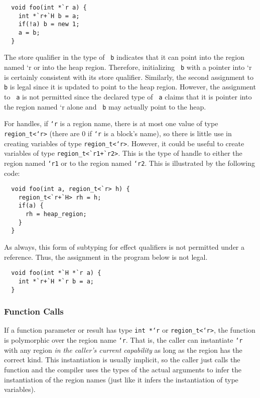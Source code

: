 \begin{verbatim}
  void foo(int *`r a) {
    int *`r+`H b = a;
    if(!a) b = new 1;
    a = b;
  }
\end{verbatim}

The store qualifier in the type of \texttt{ b} indicates that it can
point into the region named `r or into the heap region. Therefore,
initializing \texttt{ b} with a pointer into `r is certainly consistent
with its store qualifier. Similarly, the second assignment to \texttt{ b}
is legal since it is updated to point to the heap region. However, the
assignment to \texttt{ a} is not permitted since the declared type of \texttt{
  a} claims that it is pointer into the region named `r alone and \texttt{
  b} may actually point to the heap. 

For handles, if \texttt{`r} is a region name, there is at most one
value of type \texttt{region\_t<`r>} (there are 0 if \texttt{`r} is a
block's name), so there is little use in creating variables of type
\texttt{region\_t<`r>}. However, it could be useful to create
variables of type \verb^region_t<`r1+`r2>^. This is the type of
handle to either the region named \texttt{`r1} or to the region named
\texttt{`r2}. This is illustrated by the following code:

\begin{verbatim}
  void foo(int a, region_t<`r> h) {
    region_t<`r+`H> rh = h;
    if(a) {
      rh = heap_region;
    }
  }
\end{verbatim}

As always, this form of subtyping for effect qualifiers is not
permitted under a reference. Thus, the assignment in the program below
is not legal.

\begin{verbatim}
  void foo(int *`H *`r a) {
    int *`r+`H *`r b = a;
  }
\end{verbatim}

\subsubsection{Function Calls}

If a function parameter or result has type \texttt{int *`r} or
\texttt{region\_t<`r>}, the function is polymorphic over the region name
\texttt{`r}.  That is, the caller can instantiate \texttt{`r} with any
region \emph{in the caller's current capability} as long as the region has
the correct kind. This instantiation is usually implicit, so the caller just
calls the function and the compiler uses the types of the actual arguments
to infer the instantiation of the region names (just like it infers the
instantiation of type variables).

